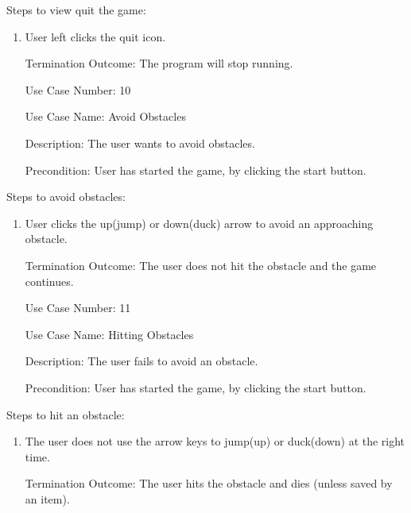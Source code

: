 \documentclass[10pt,conference,onecolumn,compsoc]{IEEEtran}
\begin{document}
Steps to view quit the game:

\begin{enumerate}
\item User left clicks the quit icon.
\item[Termination Outcome:] The program will stop running.\\
\end{enumerate}

\begin{itemize}
\item[Use Case Number:] 10
\item[Use Case Name:] Avoid Obstacles
\item[Description:] The user wants to avoid obstacles.
\item[Precondition:] User has started the game, by clicking the start button.
\end{itemize}

Steps to avoid obstacles:

\begin{enumerate}
\item User clicks the up(jump) or down(duck) arrow to avoid an approaching obstacle.
\item[Termination Outcome:] The user does not hit the obstacle and the game continues.\\
\end{enumerate}

\begin{itemize}
\item[Use Case Number:] 11
\item[Use Case Name:] Hitting Obstacles
\item[Description:] The user fails to avoid an obstacle.
\item[Precondition:] User has started the game, by clicking the start button.
\end{itemize}

Steps to hit an obstacle:

\begin{enumerate}
\item The user does not use the arrow keys to jump(up) or duck(down) at the right time.
\item[Termination Outcome:]The user hits the obstacle and dies (unless saved by an item).
\end{enumerate}
\end{document}
